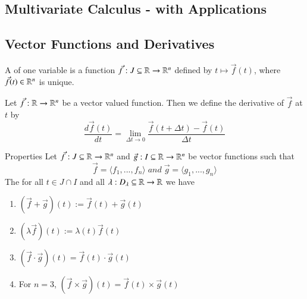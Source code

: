 \documentclass[12pt]{report}
\begin{document}
\begin{appendices}
    \section{Multivariate Calculus - with Applications}
    
    \subsection{Vector Functions and Derivatives}
    
    \begin{defn}{}{}
        A  of one variable is a function $\vec{f}:J\subseteq \mathbb R\rightarrow \mathbb R^n$ defined by $t \mapsto \vec{f}(t)$, where $\vec{f}(t) \in \mathbb R^n$ is unique. 
    \end{defn}
    
    \begin{defn}{}{}
        Let $\vec{f}:\mathbb R\rightarrow \mathbb R^n$ be a vector valued function. Then we define the derivative of $\vec{f}$ at $t$ by \begin{equation}
            \frac{d\vec{f}(t)}{dt} = \lim\limits_{\Delta t\rightarrow 0} \frac{\vec{f}(t+\Delta t) - \vec{f}(t)}{\Delta t}
        \end{equation}
    \end{defn}
    
    \begin{rmk}{Properties}{}
        Let $\vec{f}:J\subseteq \mathbb R\rightarrow \mathbb R^n$ and $\vec{g}:I\subseteq \mathbb R\rightarrow \mathbb R^n$ be vector functions such that \begin{equation}
            \vec{f} = \langle f_1,...,f_n\rangle \; and\;\vec{g} = \langle g_1,...,g_n\rangle 
        \end{equation}
        The for all $t \in J \cap I$ and all $\lambda: D_{\lambda}\subseteq \mathbb R\rightarrow \mathbb R$ we have \begin{enumerate}
            \item $(\vec{f}+\vec{g})(t) := \vec{f}(t) + \vec{g}(t)$
            \item $(\lambda\vec{f})(t) := \lambda(t)\vec{f}(t)$
            \item $(\vec{f}\cdot\vec{g})(t) = \vec{f}(t)\cdot \vec{g}(t)$
            \item For $n = 3$, $(\vec{f} \times \vec{g})(t) = \vec{f}(t) \times \vec{g}(t)$
        \end{enumerate}
    \end{rmk}
        

\end{appendices}
\end{document}
